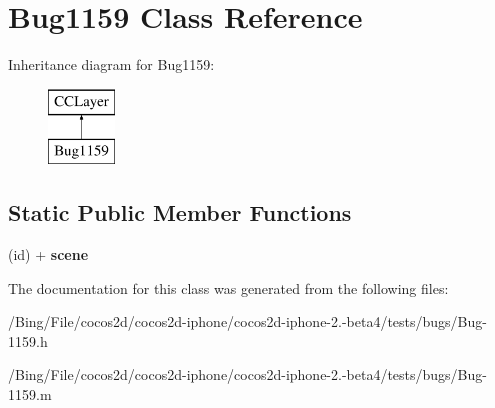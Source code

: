 \hypertarget{interface_bug1159}{\section{Bug1159 Class Reference}
\label{interface_bug1159}
}
Inheritance diagram for Bug1159\-:\begin{figure}[H]
\begin{center}
\leavevmode
\includegraphics[height=2.000000cm]{interface_bug1159}
\end{center}
\end{figure}
\subsection*{Static Public Member Functions}
\begin{DoxyCompactItemize}
\item 
\hypertarget{interface_bug1159_aa36c587a6dab1be00a7e7b215b97348f}{(id) + {\bfseries scene}}\label{interface_bug1159_aa36c587a6dab1be00a7e7b215b97348f}

\end{DoxyCompactItemize}


The documentation for this class was generated from the following files\-:\begin{DoxyCompactItemize}
\item 
/\-Bing/\-File/cocos2d/cocos2d-\/iphone/cocos2d-\/iphone-\/2.-\/beta4/tests/bugs/Bug-\/1159.\-h\item 
/\-Bing/\-File/cocos2d/cocos2d-\/iphone/cocos2d-\/iphone-\/2.-\/beta4/tests/bugs/Bug-\/1159.\-m\end{DoxyCompactItemize}
